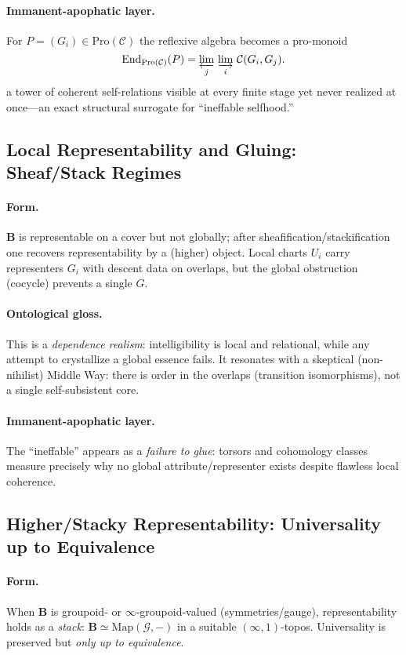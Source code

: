 \documentclass[11pt]{article}
\theoremstyle{upright}
\begin{document}
\paragraph{Immanent-apophatic layer.}
For $P=(G_i)\in \mathrm{Pro}(\mathcal C)$ the reflexive algebra becomes a pro-monoid
\[
\mathrm{End}_{\mathrm{Pro}(\mathcal C)}(P)
=\varprojlim_{j}\,\varinjlim_{i}\,\mathcal C(G_i,G_j).
\]
a tower of coherent self-relations visible at every finite stage yet never realized at once---an exact structural surrogate for ``ineffable selfhood.'' 

\subsection{Local Representability and Gluing: Sheaf/Stack Regimes}\label{subsec:local}
\paragraph{Form.}
$\mathbf B$ is representable on a cover but not globally; after sheafification/stackification one recovers representability by a (higher) object. Local charts $U_i$ carry representers $G_i$ with descent data on overlaps, but the global obstruction (cocycle) prevents a single $G$.

\paragraph{Ontological gloss.}
This is a \emph{dependence realism}: intelligibility is local and relational, while any attempt to crystallize a global essence fails. It resonates with a skeptical (non-nihilist) Middle Way: there is order in the overlaps (transition isomorphisms), not a single self-subsistent core.

\paragraph{Immanent-apophatic layer.}
The ``ineffable'' appears as a \emph{failure to glue}: torsors and cohomology classes measure precisely why no global attribute/representer exists despite flawless local coherence.

\subsection{Higher/Stacky Representability: Universality up to Equivalence}\label{subsec:stacky}
\paragraph{Form.}
When $\mathbf B$ is groupoid- or $\infty$-groupoid-valued (symmetries/gauge), representability holds as a \emph{stack}: $\mathbf B\simeq \mathrm{Map}(\mathcal G,-)$ in a suitable $(\infty,1)$-topos. Universality is preserved but \emph{only up to equivalence}. \citep{Lurie2009HTT}
\end{document}
